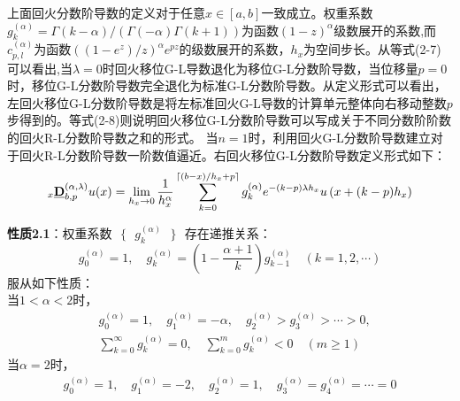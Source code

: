 \documentclass[twoside,UTF8]{nputhesis}
\newcommand{\upcite}[1]{\textsuperscript{\textsuperscript{\cite{#1}}}}
\begin{document}
上面回火分数阶导数的定义对于任意$x\in[a,b]$一致成立。权重系数$g_{k}^{(\alpha )}=\Gamma (k-\alpha )/\left( \Gamma (-\alpha )\Gamma (k+1) \right)$为函数${{(1-z)}^{\alpha }}$级数展开的系数,而$c_{p,l}^{(\alpha) }$为函数${{\left( (1-{{e}^{z}})/z \right)}^{\alpha }}{{e}^{pz}}$的级数展开的系数，$h_{x}$为空间步长。从等式(2-7)可以看出,当$\lambda =0$时回火移位G-L导数退化为移位G-L分数阶导数，当位移量$p=0$时，移位G-L分数阶导数完全退化为标准G-L分数阶导数。从定义形式可以看出，左回火移位G-L分数阶导数是将左标准回火G-L导数的计算单元整体向右移动整数$p$步得到的。等式(2-8)则说明回火移位G-L分数阶导数可以写成关于不同分数阶阶数的回火R-L分数阶导数之和的形式。                              当$n=1$时，利用回火G-L分数阶导数建立对于回火R-L分数阶导数一阶数值逼近。右回火移位G-L分数阶导数定义形式如下：
\begin{equation}
_{x}\emph{\textbf{D}}_{b,p}^{(\alpha ,\lambda )}u(x)=\lim _{h_{x}\rightarrow 0} \frac{1}{h_{x}^{\alpha}} \sum_{k=0}^{\left\lceil(b-x) / h_{x}+p\right\rceil} g_{k}^{(\alpha)} e^{-(k-p) \lambda h_{x}} u\left(x+(k-p) h_{x}\right)
\end{equation}
\noindent
\textbf{性质2.1}：权重系数$\text{ }\!\!\{\!\!\text{ }g_{k}^{(\alpha )}\text{ }\!\!\}\!\!\text{ }$存在递推关系\upcite{刘发旺2015分数阶偏微分方程数值方法及其应用}：
\begin{equation}
g_{0}^{(\alpha)}=1,\quad g_{k}^{(\alpha)}=\left(1-\frac{\alpha+1}{k}\right) g_{k-1}^{(\alpha)}\quad (k=1,2, \cdots)
\end{equation}
服从如下性质：\\
当$1<\alpha <2$时，
\begin{equation}
\begin{split}
& g_{0}^{(\alpha )}=1,\quad g_{1}^{(\alpha )}=-\alpha,\quad g_{2}^{(\alpha )}>g_{3}^{(\alpha )}>\cdots >0, \\
& \sum\limits_{k=0}^{\infty }{g_{k}^{(\alpha )}}=0,\quad \sum\limits_{k=0}^{m}{g_{k}^{(\alpha )}}<0\quad (m\ge 1)
\end{split}
\end{equation}
当$\alpha =2$时，
\begin{equation}
\begin{split}
g_{0}^{(\alpha )}=1,\quad g_{1}^{(\alpha )}=-2,\quad g_{2}^{(\alpha )}=1,\quad g_{3}^{(\alpha )}=g_{4}^{(\alpha )}=\cdots =0
\end{split}
\end{equation}
\end{document}
